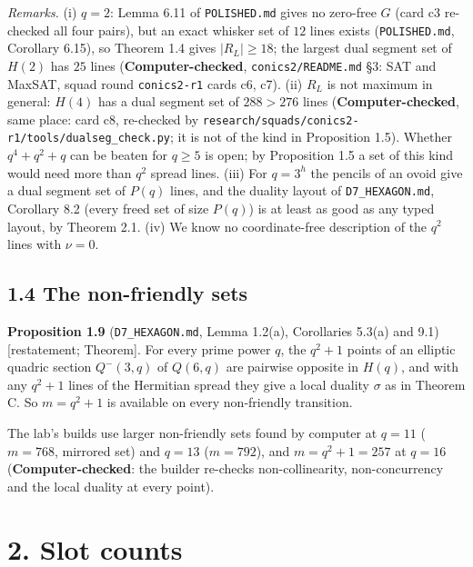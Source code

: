 \documentclass[
  10pt,
]{article}
\begin{document}
\emph{Remarks.} (i) \(q=2\): Lemma 6.11 of \texttt{POLISHED.md} gives no
zero-free \(G\) (card c3 re-checked all four pairs), but an exact
whisker set of \(12\) lines exists (\texttt{POLISHED.md}, Corollary
6.15), so Theorem 1.4 gives \(|R_L|\ge18\); the largest dual segment set
of \(H(2)\) has \(25\) lines (\textbf{Computer-checked},
\texttt{conics2/README.md} §3: SAT and MaxSAT, squad round
\texttt{conics2-r1} cards c6, c7). (ii) \(R_L\) is not maximum in
general: \(H(4)\) has a dual segment set of \(288>276\) lines
(\textbf{Computer-checked}, same place: card c8, re-checked by
\texttt{research/squads/conics2-r1/tools/dualseg\_check.py}; it is not
of the kind in Proposition 1.5). Whether \(q^4+q^2+q\) can be beaten for
\(q\ge5\) is open; by Proposition 1.5 a set of this kind would need more
than \(q^2\) spread lines. (iii) For \(q=3^h\) the pencils of an ovoid
give a dual segment set of \(P(q)\) lines, and the duality layout of
\texttt{D7\_HEXAGON.md}, Corollary 8.2 (every freed set of size
\(P(q)\)) is at least as good as any typed layout, by Theorem 2.1. (iv)
We know no coordinate-free description of the \(q^2\) lines with
\(\nu=0\).

\hypertarget{the-non-friendly-sets}{%
\subsection{1.4 The non-friendly sets}\label{the-non-friendly-sets}}

\textbf{Proposition 1.9} (\texttt{D7\_HEXAGON.md}, Lemma 1.2(a),
Corollaries 5.3(a) and 9.1) {[}restatement; Theorem{]}. For every prime
power \(q\), the \(q^2+1\) points of an elliptic quadric section
\(Q^-(3,q)\) of \(Q(6,q)\) are pairwise opposite in \(H(q)\), and with
any \(q^2+1\) lines of the Hermitian spread they give a local duality
\(\sigma\) as in Theorem C. So \(m=q^2+1\) is available on every
non-friendly transition.

The lab's builds use larger non-friendly sets found by computer at
\(q=11\) (\(m=768\), mirrored set) and \(q=13\) (\(m=792\)), and
\(m=q^2+1=257\) at \(q=16\) (\textbf{Computer-checked}: the builder
re-checks non-collinearity, non-concurrency and the local duality at
every point).

\hypertarget{slot-counts}{%
\section{2. Slot counts}\label{slot-counts}}
\end{document}
